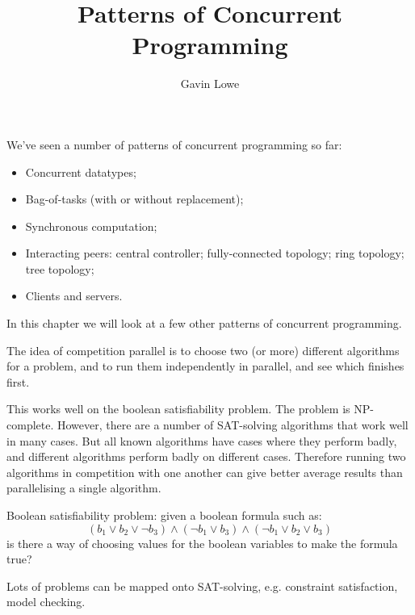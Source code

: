 \documentclass[notes,color]{sepslide0}
\title{Patterns of Concurrent Programming}
\author{Gavin Lowe}
\begin{document}
\begin{slide}
  
  \Title

\end{slide}


\begin{slide}

We've seen a number of patterns of concurrent programming so far:
%

\begin{itemize}
\item Concurrent datatypes;

\item
Bag-of-tasks (with or without replacement); 

\item
Synchronous computation; %

\item
Interacting peers: central controller; fully-connected topology; ring
topology; tree topology;

\item
Clients and servers.
\end{itemize}

In this chapter we will look at a few other patterns of concurrent programming.
\end{slide}





\begin{slide}

The idea of competition parallel is to choose two (or more) different
algorithms for a problem, and to run them independently in parallel, and see
which finishes first.

This works well on the boolean satisfiability problem.  The problem is
NP-complete.  However,  there are a number of SAT-solving algorithms that work
well in many cases.  But all known algorithms have cases where they perform
badly, and different algorithms perform badly on different cases.  Therefore
running two algorithms in competition with one another can give better average
results than parallelising a single algorithm.
\end{slide}


\begin{selfnote}
Boolean satisfiability problem: given a boolean formula such as:
\[
(b_1 \lor b_2 \lor \lnot b_3) \land (\lnot b_1 \lor b_3) \land (\lnot b_1 \lor
b_2 \lor b_3)
\]
is there a way of choosing values for the boolean variables to make the
formula true?

Lots of problems can be mapped onto SAT-solving, e.g. constraint satisfaction,
model checking. 
\end{selfnote}
\end{document}

